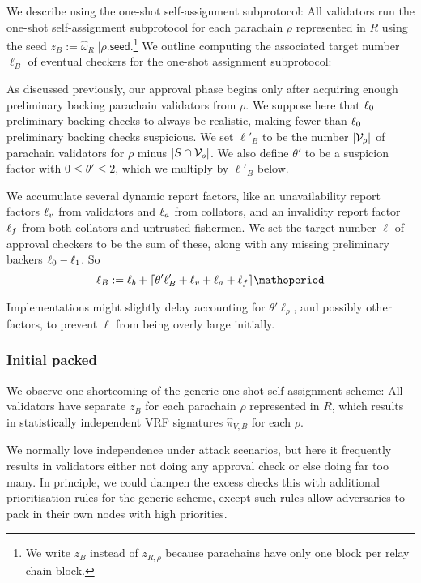 \begin{enumerate}
\begin{enumerate}
We describe using the one-shot self-assignment subprotocol:  All validators run the one-shot self-assignment subprotocol for each parachain $\rho$ represented in $R$ using the seed $z_B := \hat{\omega}_R || \rho.\mathsf{seed}$.\footnote{We write $z_B$ instead of $z_{R,\rho}$ because parachains have only one block per relay chain block.}  We outline computing the associated target number $\ell_B$ of eventual checkers for the one-shot assignment subprotocol: 

As discussed previously, our approval phase begins only after acquiring enough preliminary backing parachain validators from $\rho$.  We suppose here that $\ell_0$ preliminary backing checks to always be realistic, making fewer than $\ell_0$ preliminary backing checks suspicious.  We set $\ell'_B$ to be the number $|\mathcal{V}_\rho|$ of parachain validators for $\rho$ minus $|S \cap \mathcal{V}_\rho|$. 
We also define $\theta'$ to be a suspicion factor with $0 \le \theta' \le 2$, which we multiply by $\ell'_B$ below.

We accumulate several dynamic report factors, like an unavailability report factors $\ell_v$ from validators and $\ell_a$ from collators, and an invalidity report factor $\ell_f$ from both collators and untrusted fishermen.  We set the target number $\ell$ of approval checkers to be the sum of these, along with any missing preliminary backers $\ell_0-\ell_1$.  So
$$ \ell_B := \basesecondarychecks + \lceil \theta' \ell'_B + \rfuv + \runav + \rinv \rceil \mathoperiod $$

Implementations might slightly delay accounting for $\theta' \ell_\rho$, and possibly other factors, to prevent $\ell$ from being overly large initially. 

\subsubsection{Initial packed}

We observe one shortcoming of the generic one-shot self-assignment scheme:  All validators have separate $z_B$ for each parachain $\rho$ represented in $R$, which results in statistically independent VRF signatures $\hat{\pi}_{V,B}$ for each $\rho$.  

We normally love independence under attack scenarios, but here it frequently results in validators either not doing any approval check or else doing far too many.  In principle, we could dampen the excess checks this with additional prioritisation rules for the generic scheme, except such rules allow adversaries to pack in their own nodes with high priorities.


\end{enumerate}
\end{enumerate}
